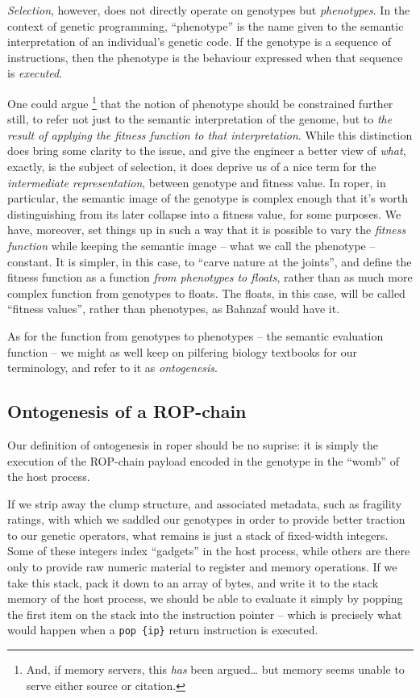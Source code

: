 \documentclass[12pt,glossary]{dalthesis}
\begin{document}
\emph{Selection}, however, does not directly operate on genotypes but \emph{phenotypes}.
In the context of genetic programming, ``phenotype'' is the name given to the semantic
interpretation of an individual's genetic code. If the genotype is a sequence of
instructions, then the phenotype is the behaviour expressed when that sequence is
\emph{executed}. 

One could argue \footnote{And, if memory servers, this \emph{has} been argued\ldots{} but memory seems unable to serve either source or citation.}  that the notion
of phenotype should be constrained further still, to refer not just to the semantic
interpretation of the genome, but to \emph{the result of applying the fitness function
to that interpretation}. 
While this distinction does bring some clarity to the issue, and give the engineer
a better view of \emph{what}, exactly, is the subject of selection, it does deprive us
of a nice term for the \emph{intermediate representation}, between genotype and fitness
value. In \gls{roper}, in particular, the semantic image of the genotype is complex
enough that it's worth distinguishing from its later collapse into a fitness value,
for some purposes. We have, moreover, set things up in such a way that it is possible
to vary the \emph{fitness function} while keeping the semantic image -- what we call the
phenotype -- constant. It is simpler, in this case, to ``carve nature at the joints'',
and define the fitness function as a function \emph{from phenotypes to floats}, rather
than as much more complex function from genotypes to floats. The floats, in this
case, will be called ``fitness values'', rather than phenotypes, as Bahnzaf would have it.

As for the function from genotypes to phenotypes -- the semantic evaluation function
-- we might as well keep on pilfering biology textbooks for our terminology, and
refer to it as \emph{ontogenesis}.

\subsection{Ontogenesis of a ROP-chain}
\label{sec:org3855993}

Our definition of ontogenesis in \gls{roper} should be no suprise: it is simply the
execution of the ROP-chain payload encoded in the genotype in the ``womb'' 
of the host process. 

If we strip away the clump structure, and associated metadata, such as fragility
ratings, with which we saddled our genotypes in order to provide better traction
to our genetic operators, what remains is just a stack of fixed-width integers.
Some of these integers index ``gadgets'' in the host process, while others are
there only to provide raw numeric material to register and memory operations. If
we take this stack, pack it down to an array of bytes, and write it to the stack
memory of the host process, we should be able to evaluate it simply by popping
the first item on the stack into the instruction pointer -- which is precisely
what would happen when a \texttt{pop \{ip\}} return instruction is executed.
\end{document}
